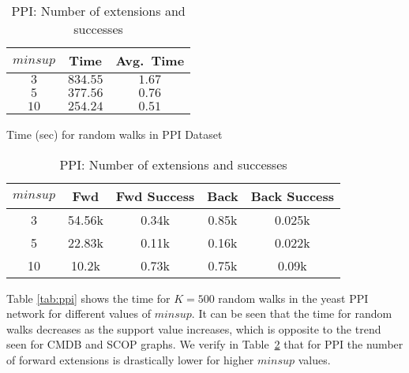 \begin{table}[!h]
\centering
\begin{tabular}{|c|c|c|}
        \hline
        $minsup$ & Time & Avg.\ Time \\
		\hline
        $3$ & $834.55$ & $1.67$ \\
        $5$ & $377.56$ & $0.76$ \\
        $10$ & $254.24$ & $0.51$ \\
		\hline
    \end{tabular}
	\vspace{-0.1in}
    \caption{Time (sec) for random walks in PPI Dataset }
\label{tab:ppi}
%
	\vspace{0.1in}
\centering
\begin{tabular}{|c|c|c|c|c|}
	\hline
        $minsup$ & Fwd & Fwd Success & Back & Back Success \\
	\hline
3	&54.56k	&	0.34k&		0.85k&		0.025k \\ 
5	&22.83k	&	0.11k&		0.16k&		0.022k\\
10	&10.2k	&	0.73k&		0.75k&		0.09k  \\
	\hline
	\end{tabular}
	\vspace{-0.1in}
	\caption{PPI: Number of extensions and successes}
	\label{tab:ppi_ext}
	\end{table}

\smallskip{}  Table \ref{tab:ppi} shows the
time for $K=500$ random walks in the yeast PPI network for different
values of $minsup$. It can be seen that the time for random walks
decreases as the support value increases, which is opposite to the
trend seen for CMDB and SCOP graphs. We verify in
Table~\ref{tab:ppi_ext} that for PPI the number of forward extensions is
drastically lower for higher $minsup$ values.

